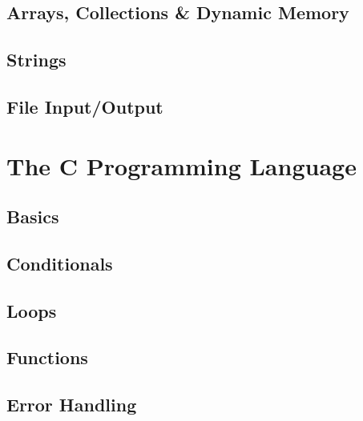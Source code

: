 \documentclass[12pt]{scrbook}
\begin{document}
\chapter{Arrays, Collections \& Dynamic Memory}
\label{chapter:arrays}



\chapter{Strings}
\label{chapter:strings}



\chapter{File Input/Output}
\label{chapter:fileIO}







\part{The C Programming Language}

\chapter{Basics}


\chapter{Conditionals}


\chapter{Loops}


\chapter{Functions}
\label{chapter:c:functions}


\chapter{Error Handling}
\label{chapter:c:errorHandling}

\end{document}
